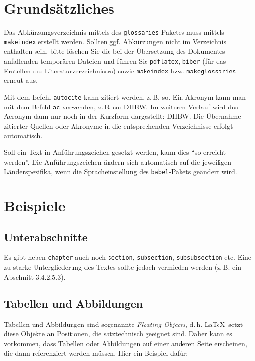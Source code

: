 \section{Grundsätzliches}

Das Abkürzungsverzeichnis mittels des \texttt{glossaries}-Paketes muss mittels \texttt{makeindex} erstellt werden. Sollten ggf. Abkürzungen nicht im Verzeichnis enthalten sein,
bitte löschen Sie die bei der Übersetzung des Dokumentes anfallenden temporären Dateien und führen Sie \texttt{pdflatex}, \texttt{biber} (für das Erstellen des Literaturverzeichnisses) sowie \texttt{makeindex} bzw. \texttt{makeglossaries} erneut aus.

Mit dem Befehl \texttt{autocite} kann zitiert werden, z.\,B. so\autocite[Vgl.][S. 18ff.]{ME12}.
Ein Akronym kann man mit dem Befehl \texttt{ac} verwenden, z.\,B. so: \ac{DHBW}. Im weiteren Verlauf wird das 
Acronym dann nur noch in der Kurzform dargestellt: \ac{DHBW}. Die Übernahme zitierter Quellen oder Akronyme in die 
entsprechenden Verzeichnisse erfolgt automatisch. 

Soll ein Text in Anführungszeichen gesetzt werden, kann dies  \enquote{so erreicht werden}. Die Anführungszeichen ändern sich automatisch auf die 
jeweiligen Länderspezifika, wenn die Spracheinstellung des \texttt{babel}-Pakets geändert wird.




\section{Beispiele}
\lipsum[1]

\subsection{Unterabschnitte}
Es gibt neben \texttt{chapter} auch noch  \texttt{section}, \texttt{subsection}, \texttt{subsubsection} etc. Eine zu starke Untergliederung des Textes sollte jedoch vermieden werden (z.\,B. ein Abschnitt 3.4.2.5.3). 

\subsection{Tabellen und Abbildungen}
Tabellen und Abbildungen sind sogenannte \textit{Floating Objects}, d.\,h. \LaTeX\ setzt diese Objekte an Positionen, die satztechnisch geeignet sind. Daher kann es vorkommen, dass Tabellen oder Abbildungen auf einer anderen Seite erscheinen, die dann referenziert werden müssen. Hier ein Beispiel dafür: 

